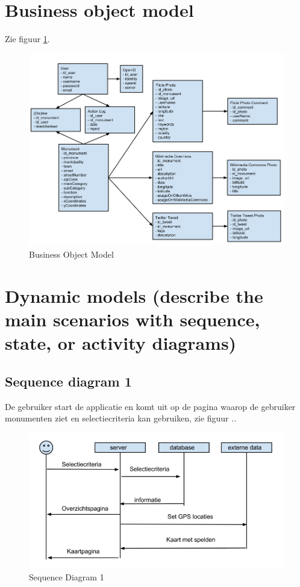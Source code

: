 \documentclass[a4paper,10pt]{article}
\begin{document}
	\section{Business object model}
		Zie figuur \ref{bom}.
		\begin{figure}[ht!]
			\centering
			\includegraphics[width=\textwidth]{BusinessObjectModel.png}
			\caption{Business Object Model \label{bom}}
		\end{figure}
		
		\clearpage
		\section{Dynamic models (describe the main scenarios with sequence, state, or activity diagrams)}
			\subsection{Sequence diagram 1}
			De gebruiker start de applicatie en komt uit op de pagina waarop de gebruiker monumenten ziet en selectiecriteria kan gebruiken, zie figuur .. %
			\begin{figure}[ht!]
				\centering
				\includegraphics[width=\textwidth]{sequence1.png}
				\caption{Sequence Diagram 1 \label{sequence1}}
			\end{figure}
\end{document}
